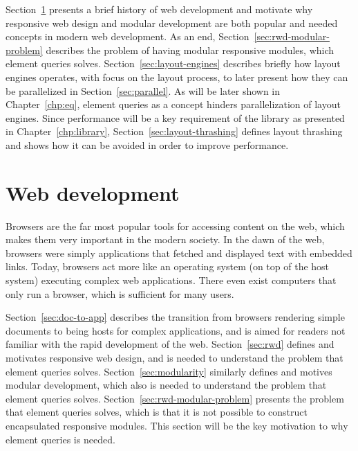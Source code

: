 \documentclass[a4paper,11pt]{kth-mag}
\begin{document}
    Section~\ref{sec:web-dev} presents a brief history of web development and motivate why responsive web design and modular development are both popular and needed concepts in modern web development.
    As an end, Section~\ref{sec:rwd-modular-problem} describes the problem of having modular responsive modules, which element queries solves.    
    Section~\ref{sec:layout-engines} describes briefly how layout engines operates, with focus on the layout process, to later present how they can be parallelized in Section~\ref{sec:parallel}.
    As will be later shown in Chapter~\ref{chp:eq}, element queries as a concept hinders parallelization of layout engines.
    Since performance will be a key requirement of the library as presented in Chapter~\ref{chp:library}, Section~\ref{sec:layout-thrashing} defines layout thrashing and shows how it can be avoided in order to improve performance.

    \section{Web development}\label{sec:web-dev}
      Browsers are the far most popular tools for accessing content on the \gls{web}, which makes them very important in the modern society.
      In the dawn of the \gls{web}, \glspl{browser} were simply applications that fetched and displayed text with embedded links.
      Today, \glspl{browser} act more like an operating system (on top of the host system) executing complex \gls{web} applications.
      There even exist computers that only run a \gls{browser}, which is sufficient for many users.
      
      Section~\ref{sec:doc-to-app} describes the transition from \glspl{browser} rendering simple \glspl{document} to being hosts for complex applications, and is aimed for readers not familiar with the rapid development of the \gls{web}.
      Section~\ref{sec:rwd} defines and motivates responsive web design, and is needed to understand the problem that element queries solves.
      Section~\ref{sec:modularity} similarly defines and motives modular development, which also is needed to understand the problem that element queries solves.
      Section~\ref{sec:rwd-modular-problem} presents the problem that element queries solves, which is that it is not possible to construct encapsulated responsive modules.
      This section will be the key motivation to why element queries is needed.
\end{document}
